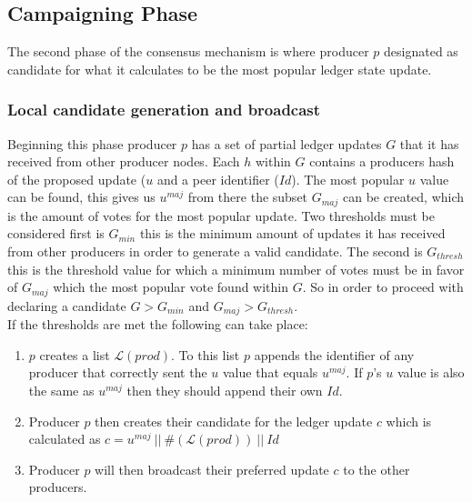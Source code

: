\documentclass{article}
\begin{document}

\subsection{Campaigning Phase}

The second phase of the consensus mechanism is where producer $p$ designated as candidate for what it calculates to be the most popular ledger state update. \\

\subsubsection{Local candidate generation and broadcast}

Beginning this phase producer $p$ has a set of partial ledger updates $G$ that it has received from other producer nodes. Each $h$ within $G$ contains a producers hash of the proposed update ($u$ and a peer identifier ($Id$). The most popular $u$ value can be found, this gives us $u^{maj}$ from there the subset $G_{maj}$ can be created, which is the amount of votes for the most popular update. Two thresholds must be considered first is $G_{min}$ this is the minimum amount of updates it has received from other producers in order to generate a valid candidate. The second is $G_{thresh}$ this is the threshold value for which a minimum number of votes must be in favor of $G_{maj}$ which the most popular vote found within $G$.  So in order to proceed with declaring a candidate $G > G_{min}$ and $G_{maj} > G_{thresh}$. \\

If the thresholds are met the following can take place:

\begin{enumerate}
\item $p$ creates a list $\mathcal{L}(prod)$. To this list $p$ appends the identifier of any producer that correctly sent the $u$ value that equals $u^{maj}$. If $p$'s $u$ value is also the same as $u^{maj}$ then they should append their own $Id$.
\item Producer $p$ then creates their candidate for the ledger update $c$ which is calculated as $c = u^{maj}~||~\#(\mathcal{L}(prod))~||~Id$
\item Producer $p$ will then broadcast their preferred update $c$ to the other producers. 
\end{enumerate}
\end{document}
